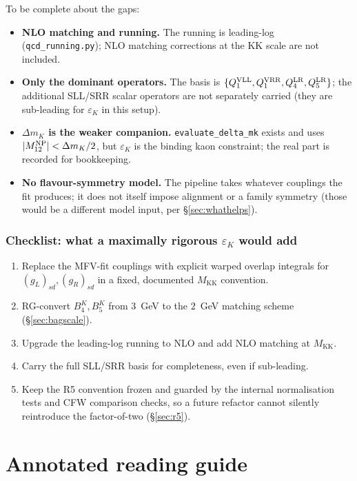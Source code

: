 \documentclass[11pt]{article}
\newcommand{\MKK}{M_{\mathrm{KK}}}
\newcommand{\epsK}{\varepsilon_K}
\newcommand{\Mtwelve}{M_{12}}
\newcommand{\dmk}{\Delta m_K}
\newcommand{\code}[1]{\texttt{#1}}
\theoremstyle{definition}
\begin{document}
To be complete about the gaps:
\begin{itemize}[leftmargin=1.4em]
\item \textbf{NLO matching and running.} The running is leading-log
(\code{qcd\_running.py}); NLO matching corrections at the KK scale are not
included.
\item \textbf{Only the dominant operators.} The basis is $\{Q_1^{\rm VLL},
Q_1^{\rm VRR}, Q_4^{\rm LR}, Q_5^{\rm LR}\}$; the additional SLL/SRR scalar
operators are not separately carried (they are sub-leading for $\epsK$ in this
setup).
\item \textbf{$\Delta m_K$ is the weaker companion.} \code{evaluate\_delta\_mk}
exists and uses $|\Mtwelve^{\rm NP}|<\dmk/2$, but $\epsK$ is the binding kaon
constraint; the real part is recorded for bookkeeping.
\item \textbf{No flavour-symmetry model.} The pipeline takes whatever couplings
the fit produces; it does not itself impose alignment or a family symmetry (those
would be a different model input, per \S\ref{sec:whathelps}).
\end{itemize}

\section{Checklist: what a maximally rigorous $\varepsilon_K$ would add}
\begin{enumerate}[leftmargin=1.8em]
\item Replace the MFV-fit couplings with explicit warped overlap integrals for
$(g_L)_{sd},(g_R)_{sd}$ in a fixed, documented $\MKK$ convention.
\item RG-convert $B_4^K,B_5^K$ from $3$~GeV to the $2$~GeV matching scheme
(\S\ref{sec:bagscale}).
\item Upgrade the leading-log running to NLO and add NLO matching at $\MKK$.
\item Carry the full SLL/SRR basis for completeness, even if sub-leading.
\item Keep the R5 convention frozen and guarded by the internal normalisation
tests and CFW comparison checks, so a future refactor cannot silently reintroduce
the factor-of-two
(\S\ref{sec:r5}).
\end{enumerate}

\part*{Annotated reading guide}
\end{document}
